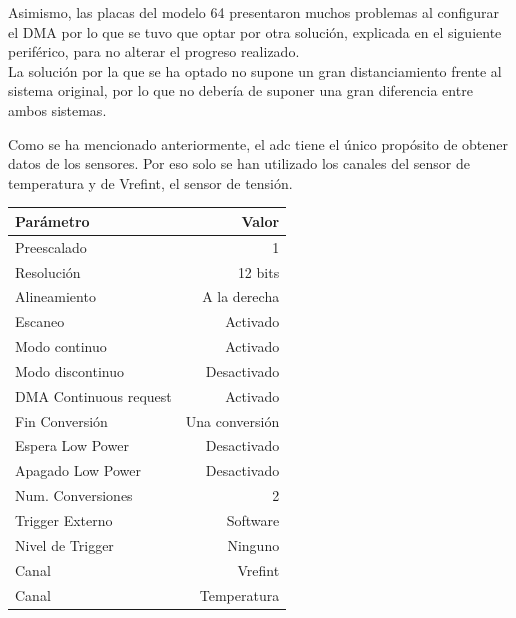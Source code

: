 \documentclass[spanish]{template/minim}
\newcommand{\dataelem}[1]{
    \noindent\textit{{\color{accent}{#1}}}
}
\begin{document}
Asimismo, las placas del modelo 64 presentaron muchos problemas al configurar el DMA por lo que se tuvo que optar por otra solución, explicada en el siguiente periférico, para no alterar el progreso realizado.\\

La solución por la que se ha optado no supone un gran distanciamiento frente al sistema original, por lo que no debería de suponer una gran diferencia entre ambos sistemas.\\

\dataelem{Conversor Analógico Digital}

Como se ha mencionado anteriormente, el \gls{adc} tiene el único propósito de obtener datos de los sensores. Por eso solo se han utilizado los canales del sensor de temperatura y de Vrefint, el sensor de tensión.\\


\begin{table}[H]
    \centering


    \begin{tabularx}{\linewidth}{Xr}
        \toprule
        Parámetro & Valor \\
        \midrule
        Preescalado & 1\\
        Resolución & 12 bits\\
        Alineamiento & A la derecha\\
        Escaneo & Activado\\
        Modo continuo & Activado\\
        Modo discontinuo & Desactivado\\
        DMA Continuous request & Activado\\
        Fin Conversión & Una conversión\\
        Espera Low Power & Desactivado\\
        Apagado Low Power & Desactivado\\
        \midrule
        Num. Conversiones & 2\\
        Trigger Externo & Software\\
        Nivel de Trigger & Ninguno\\
        Canal & Vrefint\\
        Canal & Temperatura\\
        \bottomrule
    \end{tabularx}

\end{table}
\end{document}
